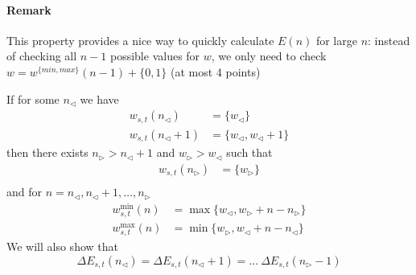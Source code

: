 \documentclass[]{article}
\begin{document}
\paragraph{Remark}
	This property provides a nice way to quickly calculate $E(n)$ for large $n$: instead of checking all $n-1$ possible values for $w$, we only need to check $w = w^{\{min,max\}}(n-1) + \{0, 1\}$ (at most 4 points)
	

\vspace{1cm}
\begin{lemma}[$w$-Parallelogram]
	If for some $n_{\triangleleft}$ we have
	\begin{align*}
	w_{s,t}(n_{\triangleleft}) &= \{w_{\triangleleft}\}\\
	w_{s,t}(n_{\triangleleft} + 1) &= \{w_{\triangleleft}, w_{\triangleleft} + 1\}
	\end{align*}
	then there exists $n_{\triangleright} > n_{\triangleleft} + 1$ and $w_{\triangleright} > w_{\triangleleft}$ such that
	\begin{align*}
	w_{s,t}(n_{\triangleright}) &= \{w_{\triangleright}\}\\
	\end{align*}
	and for $n = n_{\triangleleft}, n_{\triangleleft}+1,\dots,n_{\triangleright}$
	\begin{align*}
	w^{\min}_{s,t}(n) &= \max\{w_{\triangleleft}, w_{\triangleright} + n - n_{\triangleright}\}\\
	w^{\max}_{s,t}(n) &= \min\{w_{\triangleright}, w_{\triangleleft} + n - n_{\triangleleft}\}
	\end{align*}
	We will also show that
	\[
	\Delta E_{s,t}(n_{\triangleleft}) = \Delta E_{s,t}(n_{\triangleleft} + 1) = \dots \ \Delta E_{s,t}(n_{\triangleright} - 1)
	\]
\end{lemma}
\end{document}
